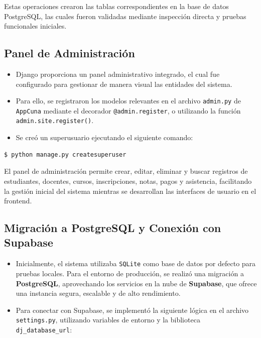 \documentclass{article}
\begin{document}
Estas operaciones crearon las tablas correspondientes en la base de datos PostgreSQL, las cuales fueron validadas mediante inspección directa y pruebas funcionales iniciales.


    \subsection{Panel de Administración}
        \begin{itemize}
            \item Django proporciona un panel administrativo integrado, el cual fue configurado para gestionar de manera visual las entidades del sistema.
            \item Para ello, se registraron los modelos relevantes en el archivo \texttt{admin.py} de \texttt{AppCuna} mediante el decorador \texttt{@admin.register}, o utilizando la función \texttt{admin.site.register()}.
            \item Se creó un superusuario ejecutando el siguiente comando:
        \end{itemize}
        \begin{lstlisting}[language=bash, caption={Creación del superusuario}, numbers=none]
        $ python manage.py createsuperuser
        \end{lstlisting}

        El panel de administración permite crear, editar, eliminar y buscar registros de estudiantes, docentes, cursos, inscripciones, notas, pagos y asistencia, facilitando la gestión inicial del sistema mientras se desarrollan las interfaces de usuario en el frontend.
    
    \subsection{Migración a PostgreSQL y Conexión con Supabase}
        \begin{itemize}
            \item Inicialmente, el sistema utilizaba \texttt{SQLite} como base de datos por defecto para pruebas locales. Para el entorno de producción, se realizó una migración a \textbf{PostgreSQL}, aprovechando los servicios en la nube de \textbf{Supabase}, que ofrece una instancia segura, escalable y de alto rendimiento.
            \item Para conectar con Supabase, se implementó la siguiente lógica en el archivo \texttt{settings.py}, utilizando variables de entorno y la biblioteca \texttt{dj\_database\_url}:
        \end{itemize}
\end{document}
